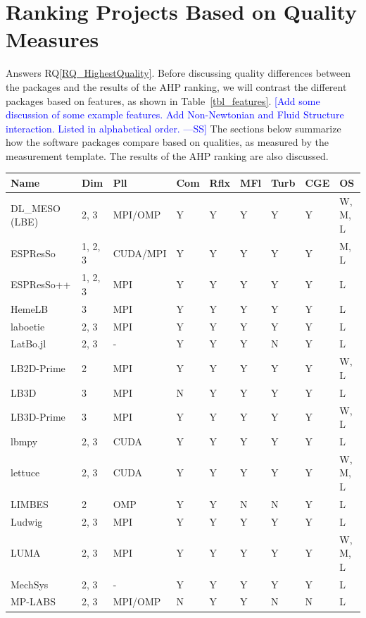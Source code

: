 \documentclass[final, 3p, times, authoryear]{elsarticle}
\newcommand{\authornote}[3]{\textcolor{#1}{[#3 ---#2]}}
\newcommand{\authornote}[3]{}
\newcommand{\wss}[1]{\authornote{blue}{SS}{#1}} %
\newcommand{\rqref}[1]{RQ\ref{#1}}
\begin{document}
\section{Ranking Projects Based on Quality Measures} \label{AHPresults}

Answers \rqref{RQ_HighestQuality}.  Before discussing quality differences between the packages and the results of
the AHP ranking, we will contrast the different packages based on features, as
shown in Table~\ref{tbl_features}. \wss{Add some discussion of some example
features.  Add Non-Newtonian and Fluid Structure interaction.  Listed in
alphabetical order.}  The sections below summarize how the software packages
compare based on qualities, as measured by the measurement template.   The
results of the AHP ranking are also discussed.

\begin{table}
	\begin{center}
		\begin{tabular}{ p{3cm}llllllll}
			\toprule
			Name & Dim & Pll & Com & Rflx & MFl & Turb & CGE & OS\\
			\midrule
			DL\_MESO (LBE) & 2, 3 & MPI/OMP & Y & Y & Y & Y & Y & W, M, L\\
			ESPResSo & 1, 2, 3 & CUDA/MPI & Y & Y & Y & Y & Y & M, L\\
			ESPResSo++ & 1, 2, 3 & MPI & Y & Y & Y & Y & Y & L\\
			HemeLB & 3 & MPI & Y & Y & Y & Y & Y & L\\
			laboetie & 2, 3 & MPI & Y & Y & Y & Y & Y & L\\
			LatBo.jl & 2, 3 & - & Y & Y & Y & N & Y & L\\
			LB2D-Prime & 2 & MPI & Y & Y & Y & Y & Y & W, L\\
			LB3D & 3 & MPI & N & Y & Y & Y & Y & L\\
			LB3D-Prime & 3 & MPI & Y & Y & Y & Y & Y & W, L\\
			lbmpy & 2, 3 & CUDA & Y & Y & Y & Y & Y & L\\
			lettuce & 2, 3 & CUDA & Y & Y & Y & Y & Y & W, M, L\\
			LIMBES & 2 & OMP & Y & Y & N & N & Y & L\\
			Ludwig & 2, 3 & MPI & Y & Y & Y & Y & Y & L\\
			LUMA & 2, 3 & MPI & Y & Y & Y & Y & Y & W, M, L\\
			MechSys & 2, 3 & - & Y & Y & Y & Y & Y & L\\
			MP-LABS & 2, 3 & MPI/OMP & N & Y & Y & N & N & L\\

\end{tabular}
\end{center}
\end{table}
\end{document}
